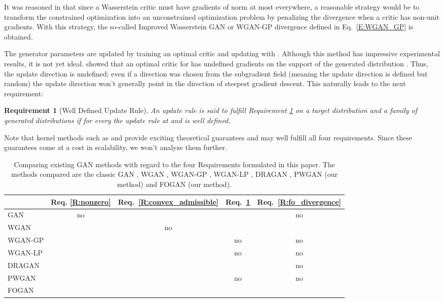 \documentclass{article}
\newtheorem{requirement}{Requirement}
\begin{document}
 It was reasoned in \cite{gulrajani2017improved} that since a Wasserstein critic must have gradients of norm at most  everywhere,
 a reasonable strategy would be to transform the constrained optimization into an unconstrained optimization problem
 by penalizing the divergence when a critic has non-unit gradients.
 With this strategy, the so-called Improved Wasserstein GAN or WGAN-GP divergence defined in Eq.\ \ref{E:WGAN_GP} is obtained.

 The generator parameters are updated by training an optimal critic  and updating with .
 Although this method has impressive experimental results, it is not yet ideal.
 \cite{petzka2017regularization} showed that an optimal critic for  has undefined gradients
 on the support of the generated distribution . Thus,
 the update direction  is undefined;
 even if a direction was chosen from the subgradient field (meaning the update direction is defined but random)
 the update direction won't generally point in the direction of steepest gradient descent.
 This naturally leads to the next requirement:

 \begin{requirement}[Well Defined Update Rule]\label{R:differentiable}
 An update rule is said to fulfill Requirement \ref{R:differentiable} on a target distribution 
 and a family of generated distributions  if
 for every  the update rule at  and  is well defined.
  \end{requirement}

 Note that kernel methods such as \cite{dziugaite2015training} and \cite{li2015generative} provide exciting theoretical guarantees
 and may well fulfill all four requirements. Since these guarantees come at a cost in scalability, we won't analyze them further.

\begin{table}
\newcommand{\nox}{\textcolor{red!70!black}{no}}\newcommand{\yescheck}{\textcolor{green!50!black}{\checkmark}}
\centering
  \caption{Comparing existing GAN methods with regard to the four Requirements formulated in this paper.
  The methods compared are the classic GAN \cite{goodfellow2014generative},
  WGAN \cite{arjovsky2017wasserstein}, WGAN-GP \cite{gulrajani2017improved},
  WGAN-LP \cite{petzka2017regularization}, DRAGAN \cite{dragan}, PWGAN (our method) and FOGAN (our method).
  }\label{Ta:whats_what}
  \begin{tabular}{lcccc}\toprule
  & Req. \ref{R:nonzero} & Req.\ \ref{R:convex_admissible} & Req.\ \ref{R:differentiable} & Req.\ \ref{R:fo_divergence} \tabularnewline \midrule
   GAN & \nox & \yescheck & \yescheck & \nox \tabularnewline
   WGAN & \yescheck & \nox & \yescheck & \yescheck \tabularnewline
   WGAN-GP & \yescheck & \yescheck & \nox & \nox \tabularnewline
   WGAN-LP & \yescheck & \yescheck & \nox & \nox \tabularnewline
   DRAGAN & \yescheck & \yescheck & \yescheck & \nox  \tabularnewline
   PWGAN & \yescheck & \yescheck & \nox & \nox  \tabularnewline
   FOGAN & \yescheck & \yescheck & \yescheck & \yescheck \tabularnewline \bottomrule
  \end{tabular}
 \end{table}
\end{document}
